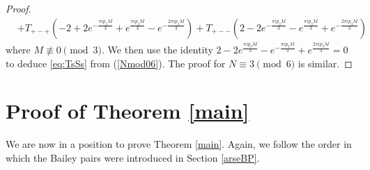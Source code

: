 \documentclass[11pt,reqno]{amsart}
\theoremstyle{definition}
\numberwithin{equation}{section}
\renewcommand{\=}{\;=\;}
\begin{document}
\begin{proof}
\begin{equation}
\begin{aligned}
&+T_{+-+} \left(-2+2e^{-\frac{\pi i p_3 M}{3}} + e^{\frac{\pi i p_3 M}{3}} - e^{-\frac{2\pi i p_3 M}{3}} \right) + T_{+--} \left( 2-2e^{-\frac{\pi i p_3 M}{3}} - e^{\frac{\pi i p_3 M}{3}} + e^{-\frac{2\pi i p_3 M}{3}} \right)
 \end{aligned}
 \end{equation}
where $M \not \equiv 0 \pmod{3}$. We then use the identity $2-2e^{\frac{\pi i p_3 M}{3}} - e^{-\frac{\pi i p_3 M}{3}} + e^{\frac{2\pi i p_3 M}{3}} =0$ to deduce \eqref{eq:TsSs} from (\ref{Nmod06}). The proof for $N\equiv 3 \pmod 6$ is similar.
\end{proof}

\section{Proof of Theorem \ref{main}}

We are now in a position to prove Theorem \ref{main}. Again, we follow the order in which the Bailey pairs were introduced in Section \ref{arseBP}.
\end{document}
